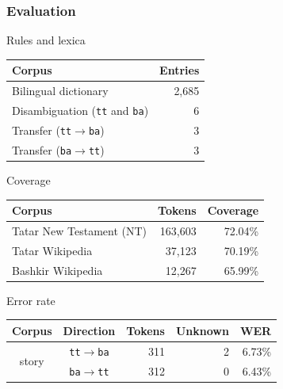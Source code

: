 \documentclass[10pt,xetex]{beamer} %
\begin{document}
\begin{frame}
  \frametitle{Evaluation}

\begin{block}{Rules and lexica}
  \begin{center}
    \begin{tabular}{lr}
    \hline
     {\bf Corpus}                        & {\bf Entries}\\
    \hline
     Bilingual dictionary                & 2,685     \\
     Disambiguation ({\small {\tt tt}} and {\small {\tt ba}}) & 6   \\
     Transfer ({\small {\tt tt$\rightarrow$ba}}) & 3 \\
     Transfer ({\small {\tt ba$\rightarrow$tt}}) & 3 \\
    \hline
    \end{tabular}
  \end{center}  

\end{block}

\begin{block}{Coverage}

\begin{center}
  \begin{tabular}{lrr}
  \hline
   {\bf Corpus}             & {\bf Tokens}    & {\bf Coverage}\\
  \hline
   Tatar New Testament (NT) & 163,603   & 72.04\% \\
   Tatar Wikipedia          & 37,123    & 70.19\% \\
  \hline
   Bashkir Wikipedia        & 12,267    & 65.99\% \\
  \hline
  \end{tabular}

\end{center}
\end{block}

\begin{block}{Error rate}
\begin{center}
  \begin{tabular}{ccrrr} 
  \hline
   {\bf Corpus}           & {\bf Direction}   & {\bf Tokens}  & {\bf Unknown} & {\bf WER}  \\
  \hline
   \multirow{2}{*}{story} & {\small {\tt tt$\rightarrow$ba}} & 311     & 2  & 6.73\% \\
                          & {\small {\tt ba$\rightarrow$tt}} & 312     & 0  & 6.43\%  \\
  \hline
  \end{tabular}
\end{center}
\end{block}

\end{frame}
\end{document}
